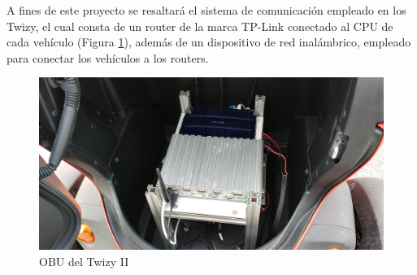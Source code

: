 \par A fines de este proyecto se resaltará el sistema de comunicación empleado en los Twizy, el cual consta de un router de la marca TP-Link conectado al CPU de cada vehículo (Figura \ref{fig:obus}), además de un dispositivo de red inalámbrico, empleado para conectar los vehículos a los routers.
\begin{figure}[!h]
	\centering
		\includegraphics[scale=0.1]{Imagenes/obus}
		\caption{OBU del Twizy II}
		\label{fig:obus}
	\end{figure}	  
